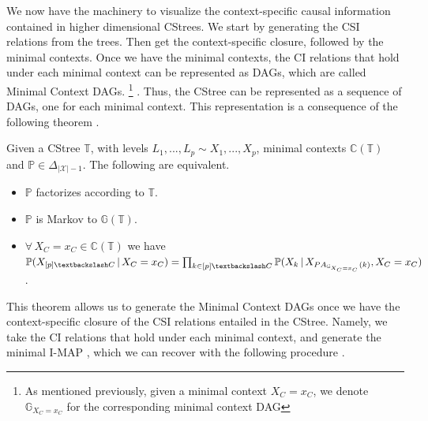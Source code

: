 \documentclass{tufte-book}
\begin{document}
We now have the machinery to visualize the context-specific causal information contained in higher dimensional CStrees. We start by generating the CSI relations from the trees. Then get the context-specific closure, followed by the minimal contexts. Once we have the minimal contexts, the CI relations that hold under each minimal context can be represented as DAGs, which are called  Minimal Context DAGs.  \footnote{As mentioned previously, given a minimal context $X_C=x_C$, we denote $\mathbb{G}_{X_C=x_C}$ for the corresponding minimal context DAG} . Thus, the CStree can be represented as a sequence of DAGs, one for each minimal context. This representation is a consequence of the following theorem \cite{duarte-2021-repres-contex}.



\begin{theorem}\label{thm:markovtheoremcstrees}
Given a CStree $\mathbb{T}$, with levels $L_1,...,L_p \sim X_1,...,X_p$, minimal contexts $\mathbb{C}(\mathbb{T})$ and $\mathbb{P} \in \Delta_{|\mathcal{X}|-1}$. The following are equivalent.
\begin{itemize}
\item $\mathbb{P}$ factorizes according to $\mathbb{T}$.
\item $\mathbb{P}$ is Markov to $\mathbb{G}(\mathbb{T})$.
\item $\forall \, X_C = x_C \in \mathbb{C}(\mathbb{T})$ we have\\ $\mathbb{P}(X_{[p]\textbackslash C}\,|\,X_C=x_C) = \prod_{k \in [p]\textbackslash C} \mathbb{P}(X_k \, |\, X_{PA_{\mathbb{G}_{X_C=x_C}}(k)}, X_C=x_C)$.
\end{itemize}
\end{theorem}

This theorem allows us to generate the Minimal Context DAGs once we have the context-specific closure of the CSI relations entailed in the CStree. Namely, we take the CI relations that hold under each minimal context, and generate the minimal I-MAP \cite{verma-1990-causal-networ}, which we can recover with the following procedure \cite{solus-2021-consis-guaran}.
\end{document}
